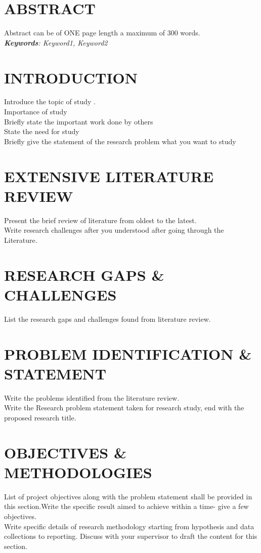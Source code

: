\pagebreak
\section*{ABSTRACT}

Abstract can be of ONE page length a maximum of 300 words.\\


\textit{\textbf{Keywords}: Keyword1, Keyword2}

\section{INTRODUCTION}

Introduce the topic of study \cite{BrusawAired}.\\
Importance of study\\
Briefly state the important work done by others\\
State the need for study\\
Briefly give the statement of the research problem what you want to study\\




\section{EXTENSIVE LITERATURE REVIEW }
Present the brief review of literature from oldest to the latest.\\
Write research challenges after you understood after going through the Literature.\\

\section{RESEARCH GAPS \& CHALLENGES}
List the research gaps and challenges found from literature review.


\section{PROBLEM IDENTIFICATION \& STATEMENT}
Write the problems identified from the literature review.\\
Write the Research problem statement taken for research study, end with the proposed research title.


\section{OBJECTIVES \& METHODOLOGIES}
List of project objectives along with the problem statement shall be provided in this section.Write the specific result aimed to achieve within a time- give a few objectives.\\
Write specific details of research methodology starting from hypothesis and data collections to reporting. Discuss with your supervisor to draft the content for this section.\\

